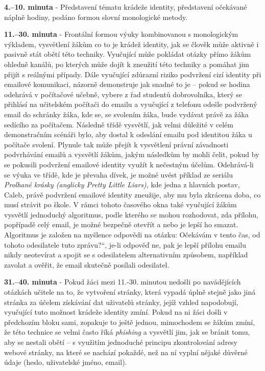 \documentclass[a4paper, 12pt]{article}
\providecommand{\uv}[1]{\quotedblbase #1\textquotedblleft}
\begin{document}
\textbf{4.--10. minuta} - Představení tématu krádeže identity, představení očekávané náplně hodiny, podáno formou slovní monologické metody.

\textbf{11.--30. minuta} - Frontální formou výuky kombinovanou s monologickým výkladem, vysvětlení žákům co to je krádež identity, jak se člověk může aktivně i pasivně stát obětí této techniky. Vyučující může pokládat otázky přímo žákům ohledně kanálů, po kterých může dojít k zneužití této techniky a pomáhat jim přijít s reálnými případy. Dále vyučující zdůrazní riziko podvržení cizí identity při emailové komunikaci, názorně demonstruje jak snadné to je -- pokud se hodina odehrává v počítačové učebně, vybere z řad studentů dobrovolníka, který se přihlásí na učitelském počítači do emailu a vyučující z telefonu odešle podvržený email do schránky žáka, kde se, se svolením žáka, bude vydávat právě za žáka sedícího za počítačem. Následně třídě vysvětlí, jak velmi důležité v celém demonstračním scénáři bylo, aby dostal k odeslání emailu pod identitou žáka u počítače svolení. Plynule tak může přejít k vysvětlení právní závadnosti podvrhávání emailů a vysvětlí žákům, jakým následkům by mohli čelit, pokud by se pokusili podvržení emailové identity využít k nečestným účelům. Odehrává-li se výuka ve třídě, kde je převaha dívek, je možné uvést příklad ze seriálu \textit{Prolhané krásky (anglicky Pretty Little Liars)}, kde jedna z hlavních postav, Caleb, právě podvržení emailové identity zneužije, aby mu byla zkrácena doba, co musí strávit po škole. V rámci tohoto časového okna také vyučující žákům vysvětlí jednoduchý algoritmus, podle kterého se mohou rozhodovat, zda přílohu, popřípadě celý email, je možné bezpečně otevřít a nebo je lepší ho smazat. Algoritmus je založen na myšlence odpovědi na otázku: \uv{Očekávám v tento čas, od tohoto odesilatele tuto zprávu?}, je-li odpověď ne, pak je lepší přílohu emailu nikdy neotevírat a spojit se s odesilatelem alternativním způsobem, například zavolat a ověřit, že email skutečně posílali odesilatel.

\textbf{31.--40. minuta} - Pokud žáci mezi 11.-30. minutou nedošli po navádějících otázkách učitele na to, že vytvoření stránky, která vypadá úplně stejně jako jiná stránka za účelem získávání dat uživatelů stránky, jejíž vzhled napodobují, vyučující tuto možnost krádeže identity zmíní. Pokud na ni žáci došli v předchozím bloku sami, zopakuje to ještě jednou, mimochodem se žákům zmíní, že této technice se velmi často říká \textit{phishing} a vysvětlí jim, jak se bránit tomu, aby se nestali obětí -- s využitím jednoduché principu zkontrolování adresy webové stránky, na které se nachází pokaždé, než na ní vyplní nějaké důvěrné údaje (heslo, uživatelské jméno, email).
\end{document}
